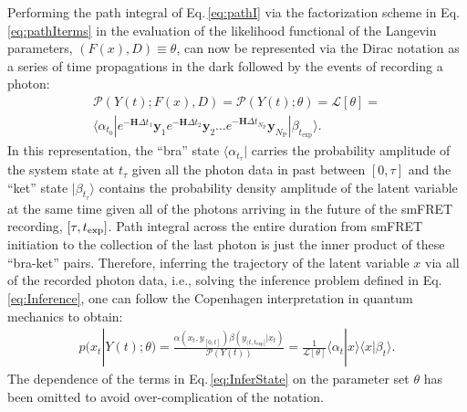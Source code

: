 \documentclass[journal=jpcbfk,manuscript=article,layout=twocolumn,articletitle=true]{achemso}
\begin{document}
Performing the path integral of Eq.\,\ref{eq:pathI} via the factorization scheme in Eq.\,\ref{eq:pathIterms} in the evaluation of the likelihood functional of the Langevin parameters, $\left ( F(x),D \right ) \equiv \theta$, can now be represented via the Dirac notation\cite{Song_2009} as a series of time propagations in the dark followed by the events of recording a photon:
\begin{multline}
\label{eq:PathP}
\mathcal{P}(Y(t) ; F(x),D) = \mathcal{P}(Y(t) ; \theta)= \mathcal{L}[\theta]= \\
\langle \alpha_{t_0} |e^{-\bm{H}\Delta t_1}\bm{y}_1e^{-\bm{H}\Delta t_2}\bm{y}_2 \ldots e^{-\bm{H}\Delta t_{N_{\mathrm{P}}}}\bm{y}_{N_{\mathrm{P}}} | \beta_{t_{\mathrm{exp}}} \rangle.
\end{multline}
In this representation, the ``bra'' state $\langle \alpha_{t_\tau} |$ carries the probability amplitude of the system state at $t_\tau$ given all the photon data in past between $[0,\tau]$ and the ``ket'' state $|\beta_{t_\tau}\rangle$ contains the probability density amplitude of the latent variable at the same time given all of the photons arriving in the future of the smFRET recording, $[\tau,t_{\rm exp}]$. Path integral across the entire duration from smFRET initiation to the collection of the last photon is just the inner product of these ``bra-ket'' pairs. Therefore, inferring the trajectory of the latent variable $x$ via all of the recorded photon data, i.e., solving the inference problem defined in Eq.\,\ref{eq:Inference}, one can follow the Copenhagen interpretation in quantum mechanics\cite{Sakurai:1985uw} to obtain:
\begin{align}
\label{eq:InferState}
p(x_t | Y(t); \theta ) = \frac{\alpha(x_t,y_{[0,t]})\beta(y_{(t,t_{\mathrm{exp}}]}|x_t)}{\mathcal{P}(Y(t))} = \frac{1}{\mathcal{L}[\theta]} \langle \alpha_t | x \rangle \langle x | \beta_t \rangle.
\end{align}
The dependence of the terms in Eq.\,\ref{eq:InferState} on the parameter set $\theta$ has been omitted to avoid over-complication of the notation.
\end{document}
